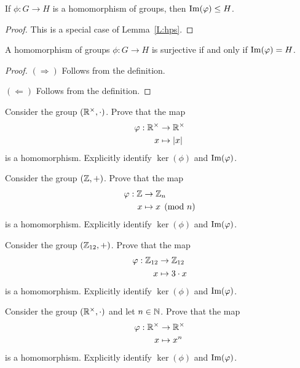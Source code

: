 \documentclass{ximera}
\begin{document}
\begin{lemma}
  If $\phi:G\to H$ is a homomorphism of groups, then $\operatorname{Im}(\varphi)\leq H$.
  \begin{proof}
    This is a special case of Lemma~\ref{L:hps}.
  \end{proof}
\end{lemma}


\begin{lemma}
    A homomorphism of groups $\phi:G\to H$ is surjective if and only
    if $\operatorname{Im}(\varphi) = H$.
    \begin{proof}
      $(\Rightarrow)$ Follows from the definition.

      $(\Leftarrow)$ Follows from the definition.
    \end{proof}
\end{lemma}


\begin{exercise}
  Consider the group $(\mathbb R^\times,\cdot)$. Prove that
  the map
  \begin{align*}
    \varphi:\mathbb R^\times &\to \mathbb R^\times\\
    x &\mapsto |x|
  \end{align*}
  is a homomorphism. Explicitly identify $\ker(\phi)$ and
  $\operatorname{Im}(\varphi)$.
\end{exercise}


\begin{exercise}
  Consider the group $(\mathbb Z,+)$. Prove that
  the map
  \begin{align*}
    \varphi:\mathbb Z &\to \mathbb Z_n\\
    x &\mapsto x\pmod{n}
  \end{align*}
  is a homomorphism. Explicitly identify $\ker(\phi)$ and
  $\operatorname{Im}(\varphi)$.
\end{exercise}


\begin{exercise}
  Consider the group $(\mathbb Z_{12},+)$. Prove that the map
  \begin{align*}
    \varphi:\mathbb Z_{12} &\to \mathbb Z_{12}\\
    x &\mapsto 3\cdot x
  \end{align*}
  is a homomorphism. Explicitly identify $\ker(\phi)$ and
  $\operatorname{Im}(\varphi)$.
\end{exercise}



\begin{exercise}
  Consider the group $(\mathbb R^\times,\cdot)$ and let $n\in \mathbb N$. Prove that
  the map
  \begin{align*}
    \varphi:\mathbb R^\times &\to \mathbb R^\times\\
    x &\mapsto x^n
  \end{align*}
  is a homomorphism. Explicitly identify $\ker(\phi)$ and
  $\operatorname{Im}(\varphi)$.
\end{exercise}
\end{document}
